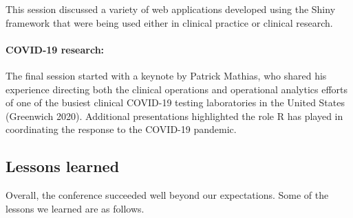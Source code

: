 This session discussed a variety of web applications developed using the Shiny framework that were being used either in clinical practice or clinical research.

\hypertarget{covid-19-research}{%
\paragraph{COVID-19 research:}\label{covid-19-research}}

The final session started with a keynote by Patrick Mathias, who shared his experience directing both the clinical operations and operational analytics efforts of one of the busiest clinical COVID-19 testing laboratories in the United States (Greenwich 2020). Additional presentations highlighted the role R has played in coordinating the response to the COVID-19 pandemic.

\hypertarget{lessons-learned}{%
\subsection{Lessons learned}\label{lessons-learned}}

Overall, the conference succeeded well beyond our expectations. Some of the lessons we learned are as follows.

